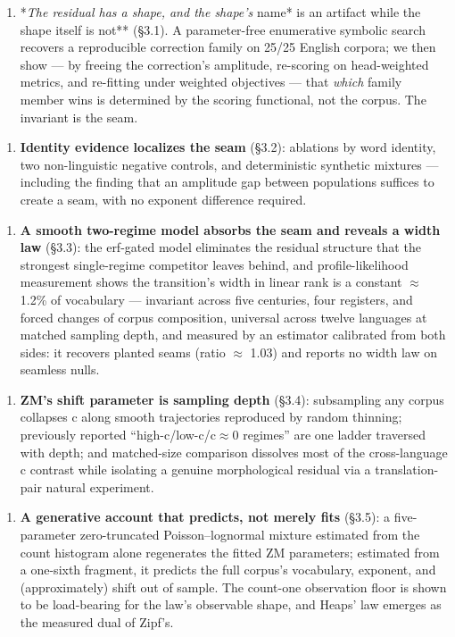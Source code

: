 \documentclass[11pt]{article}
\begin{document}
\begin{enumerate}
\item *\emph{The residual has a shape, and the shape's }name* is an artifact while the
shape itself is not** (\S3.1). A parameter-free enumerative symbolic search
recovers a reproducible correction family on 25/25 English corpora; we then
show --- by freeing the correction's amplitude, re-scoring on head-weighted
metrics, and re-fitting under weighted objectives --- that \emph{which} family member
wins is determined by the scoring functional, not the corpus. The invariant is
the seam.
\end{enumerate}
\begin{enumerate}
\item \textbf{Identity evidence localizes the seam} (\S3.2): ablations by word identity,
two non-linguistic negative controls, and deterministic synthetic mixtures ---
including the finding that an amplitude gap between populations suffices to
create a seam, with no exponent difference required.
\end{enumerate}
\begin{enumerate}
\item \textbf{A smooth two-regime model absorbs the seam and reveals a width law} (\S3.3):
the erf-gated model eliminates the residual structure that the strongest
single-regime competitor leaves behind, and profile-likelihood measurement
shows the transition's width in linear rank is a constant $\approx$1.2\% of vocabulary
--- invariant across five centuries, four registers, and forced changes of
corpus composition, universal across twelve languages at matched sampling
depth, and measured by an estimator calibrated from both sides: it recovers
planted seams (ratio $\approx$ 1.03) and reports no width law on seamless nulls.
\end{enumerate}
\begin{enumerate}
\item \textbf{ZM's shift parameter is sampling depth} (\S3.4): subsampling any corpus
collapses c along smooth trajectories reproduced by random thinning;
previously reported ``high-c/low-c/c$\approx$0 regimes'' are one ladder traversed with
depth; and matched-size comparison dissolves most of the cross-language c
contrast while isolating a genuine morphological residual via a
translation-pair natural experiment.
\end{enumerate}
\begin{enumerate}
\item \textbf{A generative account that predicts, not merely fits} (\S3.5): a five-
parameter zero-truncated Poisson--lognormal mixture estimated from the count
histogram alone regenerates the fitted ZM parameters; estimated from a
one-sixth fragment, it predicts the full corpus's vocabulary, exponent, and
(approximately) shift out of sample. The count-one observation floor is shown
to be load-bearing for the law's observable shape, and Heaps' law emerges as
the measured dual of Zipf's.
\end{enumerate}
\end{document}
